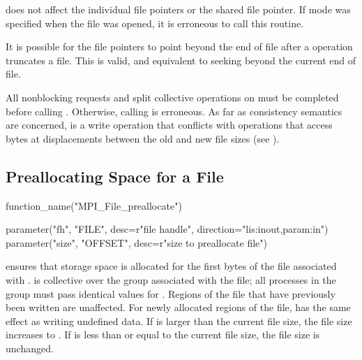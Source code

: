  does not affect the individual file pointers
or the shared file pointer.
If  mode was specified when the file was opened,
it is erroneous to call this routine.

\begin{users}
It is possible for the file pointers to point beyond the end of file
after a  operation truncates a file.
This is valid, and equivalent to seeking beyond the current end of file.
\end{users}

All nonblocking requests
and split collective operations
on  must be completed
before calling .
Otherwise, calling  is erroneous.
As far as consistency semantics are concerned,
 is a write operation
that conflicts with operations that access bytes
at displacements between the old and new file sizes
(see ).

\subsection{Preallocating Space for a File}
\label{sec:io-filecntl-preallocate}

%
%
\begin{mpi-binding}
    function_name("MPI_File_preallocate")
    
    parameter("fh", "FILE", desc=r"file handle", direction="lis:inout,param:in")
    parameter("size", "OFFSET", desc=r"size to preallocate file")
\end{mpi-binding}

 ensures that storage space is
allocated for the first  bytes of the file
associated with . 
 is collective over the group associated with the file;
all processes in the group must pass identical values for .
Regions of the file that have previously been written are unaffected.
For newly allocated regions of the file, 
has the same effect as writing undefined data.
If  is larger than the current file size,
the file size increases to .
If  is less than or equal to the current file size,
the file size is unchanged.

